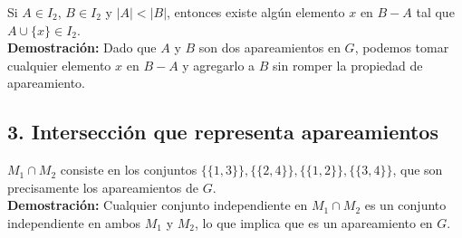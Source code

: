 \documentclass{article}
\begin{document}
Si $A \in I_2$, $B \in I_2$ y $|A| < |B|$, entonces existe algún elemento $x$ en $B - A$ tal que $A \cup \{x\} \in I_2$.\\

\textbf{Demostración:} Dado que $A$ y $B$ son dos apareamientos en $G$, podemos tomar cualquier elemento $x$ en $B - A$ y agregarlo a $B$ sin romper la propiedad de apareamiento.


\subsection*{3. Intersección que representa apareamientos}

$M_1 \cap M_2$ consiste en los conjuntos $\{\{1, 3\}\}, \{\{2, 4\}\}, \{\{1, 2\}\}, \{\{3, 4\}\}$, que son precisamente los apareamientos de $G$.\\

\textbf{Demostración:} Cualquier conjunto independiente en $M_1 \cap M_2$ es un conjunto independiente en ambos $M_1$ y $M_2$, lo que implica que es un apareamiento en $G$.
\end{document}

